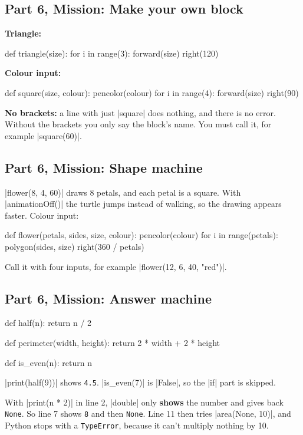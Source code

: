\subsection*{Part 6, Mission: Make your own block}
\textbf{Triangle:}
\begin{codenonum}
def triangle(size):
    for i in range(3):
        forward(size)
        right(120)
\end{codenonum}
\textbf{Colour input:}
\begin{codenonum}
def square(size, colour):
    pencolor(colour)
    for i in range(4):
        forward(size)
        right(90)
\end{codenonum}
\textbf{No brackets:} a line with just \py|square| does nothing, and there is no error. Without the brackets you only say the block's name. You must call it, for example \py|square(60)|.

\subsection*{Part 6, Mission: Shape machine}
\py|flower(8, 4, 60)| draws 8 petals, and each petal is a square. With \py|animationOff()| the turtle jumps instead of walking, so the drawing appears faster. Colour input:
\begin{codenonum}
def flower(petals, sides, size, colour):
    pencolor(colour)
    for i in range(petals):
        polygon(sides, size)
        right(360 / petals)
\end{codenonum}
Call it with four inputs, for example \py|flower(12, 6, 40, "red")|.

\subsection*{Part 6, Mission: Answer machine}
\begin{codenonum}
def half(n):
    return n / 2

def perimeter(width, height):
    return 2 * width + 2 * height

def is_even(n):
    return n %
\end{codenonum}
\py|print(half(9))| shows \texttt{4.5}. \py|is_even(7)| is \py|False|, so the \py|if| part is skipped.

With \py|print(n * 2)| in line 2, \py|double| only \textbf{shows} the number and gives back \texttt{None}. So line 7 shows \texttt{8} and then \texttt{None}. Line 11 then tries \py|area(None, 10)|, and Python stops with a \texttt{TypeError}, because it can't multiply nothing by 10.

